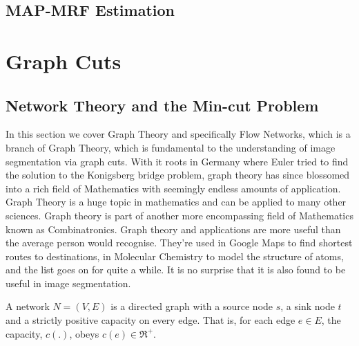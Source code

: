 \subsection{MAP-MRF Estimation}
\label{sec:MAPMRFEstimation}


\section{Graph Cuts}
\label{sec:GraphCuts}


\subsection{Network Theory and the Min-cut Problem}
\label{sec:NetworkTheory}

In this section we cover Graph Theory and specifically Flow Networks, which is a branch of Graph Theory, which is fundamental to the understanding of image segmentation via graph cuts. With it roots in Germany where Euler tried to find the solution to the Konigsberg bridge problem, graph theory has since blossomed into a rich field of Mathematics with seemingly endless amounts of application. Graph Theory is a huge topic in mathematics and can be applied to many other sciences. Graph theory is part of another more encompassing field of Mathematics known as Combinatronics. Graph theory and applications are more useful than the average person would recognise. They're used in Google Maps to find shortest routes to destinations, in Molecular Chemistry to model the structure of atoms, and the list goes on for quite a while. It is no surprise that it is also found to be useful in image segmentation.

\begin{definition}[Network]
	A network $N = (V,E)$ is a directed graph with a source node $s$, a sink node $t$ and a strictly positive capacity on every edge. That is, for each edge $e \in E$, the capacity, $c(.)$, obeys $c(e) \in \Re^{+}$.
\end{definition}

